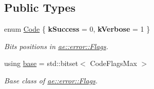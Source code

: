 \subsection*{Public Types}
\begin{DoxyCompactItemize}
\item 
\hypertarget{structae_1_1error_1_1_flags_ac202ad39c23bb50a535c1a9af3a8c0b1}{}\label{structae_1_1error_1_1_flags_ac202ad39c23bb50a535c1a9af3a8c0b1} 
enum \hyperlink{structae_1_1error_1_1_flags_ac202ad39c23bb50a535c1a9af3a8c0b1}{Code} \{ {\bfseries k\+Success} = 0, 
{\bfseries k\+Verbose} = 1
 \}\begin{DoxyCompactList}\small\item\em Bits positions in \hyperlink{structae_1_1error_1_1_flags}{ae\+::error\+::\+Flags}. \end{DoxyCompactList}
\item 
\hypertarget{structae_1_1error_1_1_flags_a9a0599e8c956ab8b269a83e68706aff4}{}\label{structae_1_1error_1_1_flags_a9a0599e8c956ab8b269a83e68706aff4} 
using \hyperlink{structae_1_1error_1_1_flags_a9a0599e8c956ab8b269a83e68706aff4}{base} = std\+::bitset$<$ Code\+Flags\+Max $>$
\begin{DoxyCompactList}\small\item\em Base class of \hyperlink{structae_1_1error_1_1_flags}{ae\+::error\+::\+Flags}. \end{DoxyCompactList}\end{DoxyCompactItemize}

